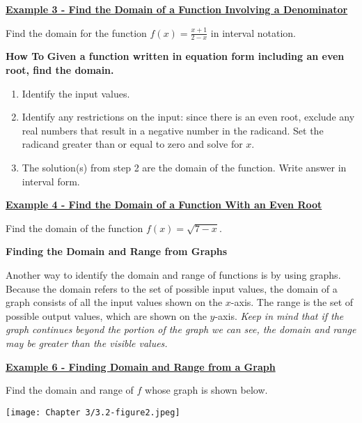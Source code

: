\documentclass[12pt]{book}
\newcommand{\D}{\displaystyle}
\begin{document}
\underline{\textbf{Example 3 - Find the Domain of a Function Involving a Denominator}}
\vspace{1mm}

Find the domain for the function $\D f(x) = \frac{x+1}{2-x}$ in interval notation. 
    \newpage


\begin{boxR}
    \textbf{How To}
    \vspace{1mm}
    \hline
    \vspace{2mm}
    \textbf{Given a function written in equation form including an even root, find the domain.}
    \begin{enumerate}
        \item Identify the input values.
        \item Identify any restrictions on the input: since there is an even root, exclude any real numbers that result in a negative number in the radicand. Set the radicand greater than or equal to zero and solve for $x$.
        \item The solution(s) from step 2 are the domain of the function. Write answer in interval form.
    \end{enumerate}
\end{boxR}
\vspace{1mm}
 
\underline{\textbf{Example 4 - Find the Domain of a Function With an Even Root}}

Find the domain of the function $f(x)=\sqrt{7-x}$.



\newpage

{\large \textbf{Finding the Domain and Range from Graphs}}

Another way to identify the domain and range of functions is by using graphs. Because the domain refers to the set of possible input values, the domain of a graph consists of all the input values shown on the $x$-axis. The range is the set of possible output values, which are shown on the $y$-axis. \emph{Keep in mind that if the graph continues beyond the portion of the graph we can see, the domain and range may be greater than the visible values.}

\vspace{3mm}

\underline{\textbf{Example 6 - Finding Domain and Range from a Graph}}

Find the domain and range of $f$ whose graph is shown below. 

\centerline {\texttt{[image: Chapter 3/3.2-figure2.jpeg]}}
\end{document}
